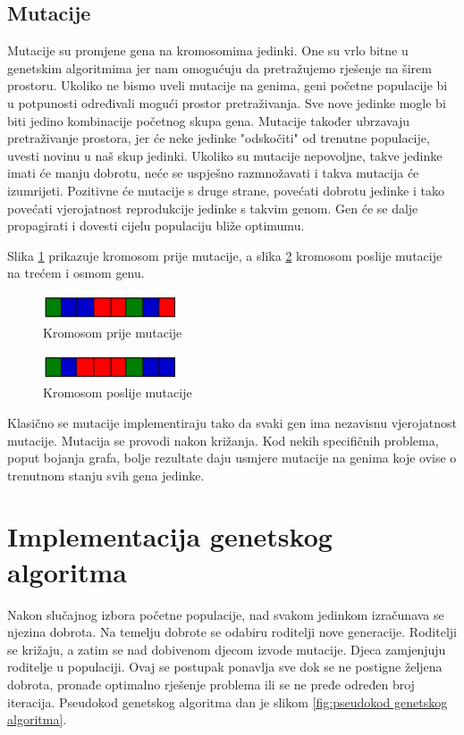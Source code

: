 \documentclass[times, utf8, zavrsni, numeric]{fer}
\begin{document}
\subsection{Mutacije}
Mutacije su promjene gena na kromosomima jedinki. One su vrlo bitne u genetskim algoritmima jer nam omogućuju da pretražujemo rješenje na širem prostoru. Ukoliko ne bismo uveli mutacije na genima, geni početne populacije bi u potpunosti određivali mogući prostor pretraživanja. Sve nove jedinke mogle bi biti jedino kombinacije početnog skupa gena. Mutacije također ubrzavaju pretraživanje prostora, jer će neke jedinke "odskočiti" od trenutne populacije, uvesti novinu u naš skup jedinki. Ukoliko su mutacije nepovoljne, takve jedinke imati će manju dobrotu, neće se uspješno razmnožavati i takva mutacija će izumrijeti. Pozitivne će mutacije s druge strane, povećati dobrotu jedinke i tako povećati vjerojatnost reprodukcije jedinke s takvim genom. Gen će se dalje propagirati i dovesti cijelu populaciju bliže optimumu.

Slika \ref{fig:kromosom prije mutacije} prikazuje kromosom prije mutacije, a slika \ref{fig:kromosom poslije mutacije} kromosom poslije mutacije na trećem i osmom genu.

\begin{figure}[htb]
\centering
\includegraphics[width=4cm]{images/prije_mutacije.png}
\caption{Kromosom prije mutacije}
\label{fig:kromosom prije mutacije}
\end{figure}

\begin{figure}[htb]
\centering
\includegraphics[width=4cm]{images/poslije_mutacije.png}
\caption{Kromosom poslije mutacije}
\label{fig:kromosom poslije mutacije}
\end{figure}

Klasično se mutacije implementiraju tako da svaki gen ima nezavisnu vjerojatnost mutacije. Mutacija se provodi nakon križanja. Kod nekih specifičnih problema, poput bojanja grafa, bolje rezultate daju usmjere mutacije na genima koje ovise o trenutnom stanju svih gena jedinke.

\section{Implementacija genetskog algoritma}
Nakon slučajnog izbora početne populacije, nad svakom jedinkom izračunava se njezina dobrota. Na temelju dobrote se odabiru roditelji nove generacije. Roditelji se križaju, a zatim se nad dobivenom djecom izvode mutacije. Djeca zamjenjuju roditelje u populaciji. Ovaj se postupak ponavlja sve dok se ne postigne željena dobrota, pronađe optimalno rješenje problema ili se ne pređe određen broj iteracija. Pseudokod genetskog algoritma dan je slikom \ref{fig:pseudokod genetskog algoritma}.
\end{document}
